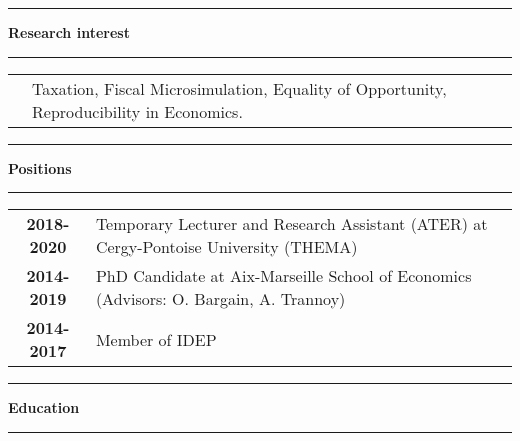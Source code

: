 \documentclass[a4paper,11pt]{article} %
\newcommand{\titre}[1]{%
	\begin{center}
	\rule{\textwidth}{1pt}
	\par\vspace{0.1cm}
        \textbf{\large #1}
	\par\rule{\textwidth}{1pt}
	\end{center}
	}
\begin{document}
\titre{Research interest}

\begin{tabular}{c@{}p{}}

&Taxation, Fiscal Microsimulation, Equality of Opportunity, Reproducibility in Economics.
%  
\end{tabular}

\titre{Positions}

\begin{tabular}{c@{:  }p{}}
\textbf{2018-2020} & Temporary Lecturer and Research Assistant (ATER) at Cergy-Pontoise University (THEMA) \\
 \textbf{2014-2019} & PhD Candidate at Aix-Marseille School of Economics (Advisors: O. Bargain, A. Trannoy) \\
  \textbf{2014-2017} & Member of IDEP\\
  
\end{tabular}
\titre{Education}
\end{document}

